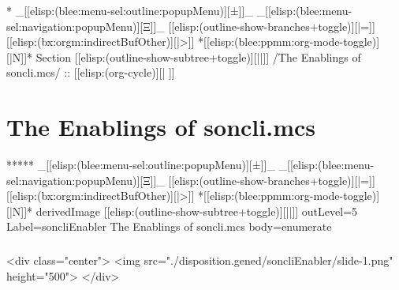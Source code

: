 
\begin{whenOrg}
*  _[[elisp:(blee:menu-sel:outline:popupMenu)][±]]_ _[[elisp:(blee:menu-sel:navigation:popupMenu)][Ξ]]_ [[elisp:(outline-show-branches+toggle)][|=]] [[elisp:(bx:orgm:indirectBufOther)][|>]] *[[elisp:(blee:ppmm:org-mode-toggle)][|N]]*  Section    [[elisp:(outline-show-subtree+toggle)][||]]   /The Enablings of soncli.mcs/ ::  [[elisp:(org-cycle)][| ]]
\end{whenOrg}

\section{The Enablings of soncli.mcs}


\begin{whenOrg}
*****  _[[elisp:(blee:menu-sel:outline:popupMenu)][±]]_ _[[elisp:(blee:menu-sel:navigation:popupMenu)][Ξ]]_ [[elisp:(outline-show-branches+toggle)][|=]] [[elisp:(bx:orgm:indirectBufOther)][|>]] *[[elisp:(blee:ppmm:org-mode-toggle)][|N]]*  derivedImage [[elisp:(outline-show-subtree+toggle)][||]] outLevel=5 Label=soncliEnabler The Enablings of soncli.mcs body=enumerate
\end{whenOrg}

\begin{htmlonly}

\begin{frame}[fragile,plain,label=soncliEnabler]
    \frametitle{}
    \framesubtitle{}
    \begin{rawhtml}
<div class="center">
<img src="./disposition.gened/soncliEnabler/slide-1.png" height="500">
</div>
    \end{rawhtml}
\end{frame}
\end{htmlonly}

